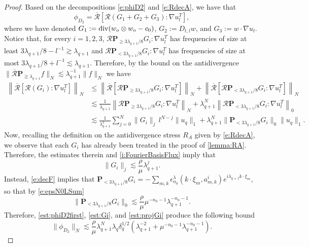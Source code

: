 \documentclass[10pt,a4paper]{amsart}
\numberwithin{equation}{section}
\numberwithin{corollario}{section}
\numberwithin{lemma}{section}
\numberwithin{prop}{section}
\theoremstyle{definition}
\theoremstyle{remark}
\newcommand{\dvg}{\mathord{{\rm div}}}
\newcommand{\proj}{\mathbf{P}}
\newcommand{\qq}{_{q+1}}
\begin{document}
\begin{proof}
    Based on the decompositions \eqref{e:phiD2} and \eqref{e:RdecA}, we have that
    \begin{equation}
        \phi_{D_2}=\overline{\mathcal{R}}\left[\mathcal{R}\left(G_1+G_2+G_3\right):\nabla u_l^T\right],
    \end{equation}
where we have denoted $G_1:=\dvg(w_o \otimes w_o-c_0)$, $G_2 := D_{t,l}w$, and $G_3:= w\cdot \nabla u_l$. Notice that, for every $i=1,2,3$, $\mathcal{R}\proj_{\geq 3\lambda\qq/8}G_i:\nabla u_l^T$ has frequencies of size at least $3\lambda\qq/8-l^{-1} \gtrsim \lambda\qq$ and $\mathcal{R}\proj_{< 3\lambda\qq/8}G_i:\nabla u_l^T$ has frequencies of size at most $3\lambda\qq/8+l^{-1} \lesssim \lambda\qq$. Therefore, by the bound on the antidivergence $\|\overline{\mathcal{R}}\proj_{\gtrsim \lambda\qq} f\|_N\lesssim \lambda\qq^{-1}\|f\|_N$ we have
\begin{align} \label{est:phiD2first}
   \left\|\overline{\mathcal{R}}\left[\mathcal{R}\left(G_i\right):\nabla u_l^T\right]\right\|_N
   &\le  
   \left\|\overline{\mathcal{R}}\left[\mathcal{R}\proj_{\geq 3\lambda\qq/8}G_i:\nabla u_l^T\right]\right\|_N
   +
   \left\|\overline{\mathcal{R}}\left[\mathcal{R}\proj_{<3 \lambda\qq/8}G_i:\nabla u_l^T\right]\right\|_N
   \\
&\lesssim
\frac1{ \lambda\qq}\left\|\mathcal{R}\proj_{\geq 3\lambda\qq/8}G_i:\nabla u_l^T\right\|_N
+
{}\lambda\qq^N \left\|\mathcal{R}\proj_{< 3\lambda\qq/8}G_i:\nabla u_l^T \right\|_0
\\
&\lesssim 
\frac1{ \lambda\qq^2}\sum_{j=0}^N \|G_i\|_j\,l^{N-j}\|u_q\|_1
+
{\lambda\qq^N} \|\proj_{<3\lambda\qq/8}G_i\|_0\|u_q\|_1.
\end{align}
Now, recalling the definition on the antidivergence stress $R_A$ given by \eqref{e:RdecA}, we observe that each $G_i$ has already been treated in the proof of \autoref{lemma:RA}. Therefore, the estimates therein and \eqref{i:FourierBasisFlux} imply that
\begin{equation}\label{est:Gi}
    \|G_i\|_j\lesssim \frac{\rho}{\mu}\lambda\qq^j.
\end{equation}
Instead, \eqref{e:decF} implies that $\proj_{<3\lambda\qq/8}G_i=-\sum_{m,k}\epsilon_{n_0}^{\lambda}(k\cdot \xi_m,a_{m,k}^i)e^{i\lambda\qq k\cdot \xi_m}$, so that by \eqref{e:epsN0LSum}
\begin{equation}\label{est:projGi}
    \|\proj_{<3\lambda\qq/8}G_i\|_0\lesssim \frac{\rho}{\mu}\mu^{-n_0-1}\lambda\qq^{-n_0-1}.
\end{equation}
Therefore, \eqref{est:phiD2first},  \eqref{est:Gi}, and \eqref{est:projGi} produce the following bound
\begin{equation}
    \|\phi_{D_2}\|_N\lesssim \frac{\rho}{\mu}\lambda\qq^N\lambda_q\delta_q^{1/2}(\lambda\qq^{-2}+\mu^{-n_0-1}\lambda\qq^{-n_0-1}).
\end{equation}


\end{proof}
\end{document}
